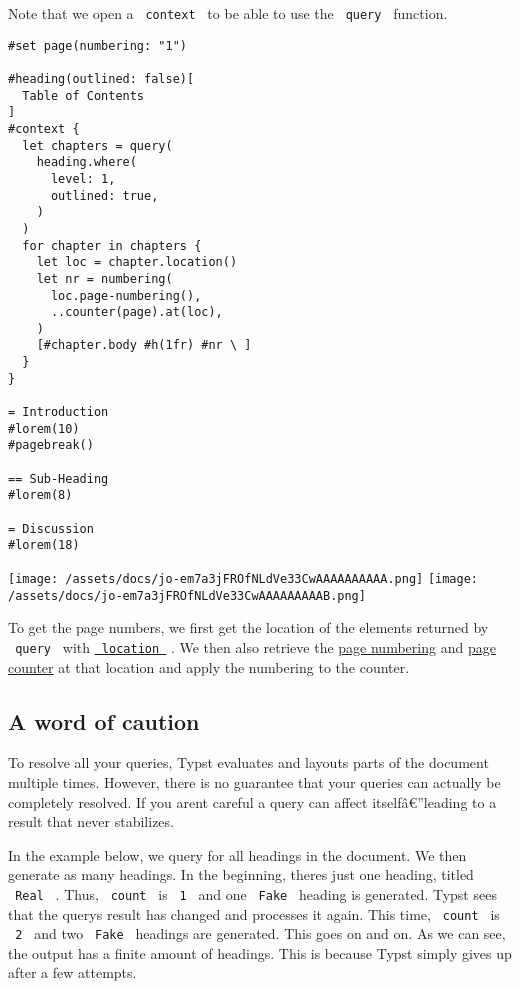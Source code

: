Note that we open a \texttt{\ context\ } to be able to use the
\texttt{\ query\ } function.

\begin{verbatim}
#set page(numbering: "1")

#heading(outlined: false)[
  Table of Contents
]
#context {
  let chapters = query(
    heading.where(
      level: 1,
      outlined: true,
    )
  )
  for chapter in chapters {
    let loc = chapter.location()
    let nr = numbering(
      loc.page-numbering(),
      ..counter(page).at(loc),
    )
    [#chapter.body #h(1fr) #nr \ ]
  }
}

= Introduction
#lorem(10)
#pagebreak()

== Sub-Heading
#lorem(8)

= Discussion
#lorem(18)
\end{verbatim}

\texttt{[image: /assets/docs/jo-em7a3jFROfNLdVe33CwAAAAAAAAAA.png]}
\texttt{[image: /assets/docs/jo-em7a3jFROfNLdVe33CwAAAAAAAAAB.png]}

To get the page numbers, we first get the location of the elements
returned by \texttt{\ query\ } with
\href{/docs/reference/foundations/content/\#definitions-location}{\texttt{\ location\ }}
. We then also retrieve the
\href{/docs/reference/introspection/location/\#definitions-page-numbering}{page
numbering} and
\href{/docs/reference/introspection/counter/\#page-counter}{page
counter} at that location and apply the numbering to the counter.

\subsection{A word of caution}\label{caution}

To resolve all your queries, Typst evaluates and layouts parts of the
document multiple times. However, there is no guarantee that your
queries can actually be completely resolved. If you
aren\textquotesingle t careful a query can affect itselfâ€''leading to a
result that never stabilizes.

In the example below, we query for all headings in the document. We then
generate as many headings. In the beginning, there\textquotesingle s
just one heading, titled \texttt{\ Real\ } . Thus, \texttt{\ count\ } is
\texttt{\ 1\ } and one \texttt{\ Fake\ } heading is generated. Typst
sees that the query\textquotesingle s result has changed and processes
it again. This time, \texttt{\ count\ } is \texttt{\ 2\ } and two
\texttt{\ Fake\ } headings are generated. This goes on and on. As we can
see, the output has a finite amount of headings. This is because Typst
simply gives up after a few attempts.

